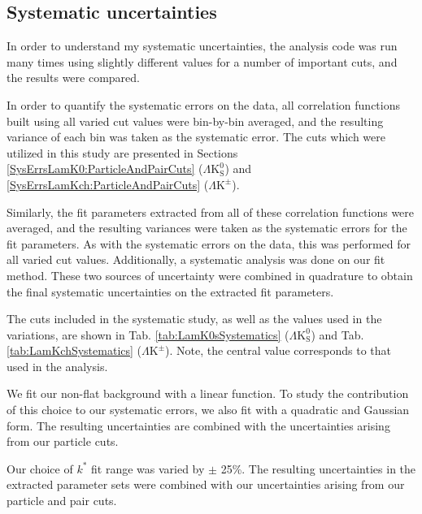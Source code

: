 \documentclass[ALICE,manyauthors]{cernphprep}
\newcommand{\kstar}{$k^{*}$\xspace}
\newcommand{\LamKpm}{$\Lambda\mathrm{K^{\pm}}$\xspace}
\newcommand{\LamKs}{$\Lambda\mathrm{K^{0}_{S}}$\xspace}
\begin{document}
\subsection{Systematic uncertainties}
\label{SysErrs}

In order to understand my systematic uncertainties, the analysis code was run many times using slightly different values for a number of important cuts, and the results were compared.

In order to quantify the systematic errors on the data, all correlation functions built using all varied cut values were bin-by-bin averaged, and the resulting variance of each bin was taken as the systematic error.  
The cuts which were utilized in this study are presented in Sections \ref{SysErrsLamK0:ParticleAndPairCuts} (\LamKs) and \ref{SysErrsLamKch:ParticleAndPairCuts} (\LamKpm).


Similarly, the fit parameters extracted from all of these correlation functions were averaged, and the resulting variances were taken as the systematic errors for the fit parameters.
As with the systematic errors on the data, this was performed for all varied cut values.
Additionally, a systematic analysis was done on our fit method.
These two sources of uncertainty were combined in quadrature to obtain the final systematic uncertainties on the extracted fit parameters.

The cuts included in the systematic study, as well as the values used in the variations, are shown in Tab. \ref{tab:LamK0sSystematics} (\LamKs) and Tab. \ref{tab:LamKchSystematics} (\LamKpm).  
Note, the central value corresponds to that used in the analysis.

We fit our non-flat background with a linear function.  
To study the contribution of this choice to our systematic errors, we also fit with a quadratic and Gaussian form. 
The resulting uncertainties are combined with the uncertainties arising from our particle cuts.

Our choice of \kstar fit range was varied by $\pm$ 25\%.  
The resulting uncertainties in the extracted parameter sets were combined with our uncertainties arising from our particle and pair cuts.
\end{document}
